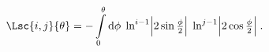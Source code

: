 \begin{equation}
\label{Lsc}
\Lsc{i,j}{\theta}=-\int\limits_0^{\theta}
{\rm d}\phi\; \ln^{i-1}\Bigl|2\sin\tfrac{\phi}{2}\Bigr| \;
\ln^{j-1}\Bigl|2\cos\tfrac{\phi}{2}\Bigr| \; .
\end{equation}

